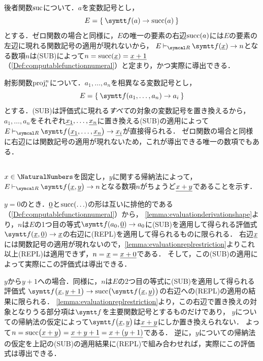 後者関数\(\operatorname{suc}\)について．\(a\)を変数記号とし，
\[
	E = \Set{\apply{\obj{f}}{a} \evaluate \apply{\succfunc}{a}}
\]
とする．ゼロ関数の場合と同様に，\(E\)の唯一の要素の右辺\(\apply{\succfunc}{a}\)には\(E\)の要素の左辺に現れる関数記号の適用が現れないから，
\(E \evaluatable \apply{\obj{f}}{\numeral{x}} \evaluate n\)となる数項\(n\)は(SUB)によって\(n = \apply{\succfunc}{\numeral{x}} = \numeral{x + 1}\)（\cref{Def:computablefunctionnumeral}）と定まり，かつ実際に導出できる．

射影関数\(\operatorname{proj}_i^n\)について．\(a_1, \dots, a_n\)を相異なる変数記号とし，
\[
	E = \Set{\apply{\obj{f}}{a_1, \dots, a_n} \evaluate a_i}
\]
とする．(SUB)は評価式に現れる\emph{すべて}の対象の変数記号を置き換えるから，
\(a_1, \dots, a_n\)をそれぞれ\(\underline{x_1}, \dots, \underline{x_n}\)に置き換える(SUB)の適用によって
\(E \evaluatable \apply{\obj{f}}{\numeral{x_1}, \dots, \numeral{x_n}} \evaluate \numeral{x_i}\)が直接得られる．
ゼロ関数の場合と同様に右辺には関数記号の適用が現れないため，これが導出できる唯一の数項でもある．

\subsection*{}

\(x \in \NaturalNumbers\)を固定し，\(y\)に関する帰納法によって，
\(E \evaluatable \apply{\obj{f}}{\numeral{x}, \numeral{y}} \evaluate n\)となる数項\(n\)がちょうど\(\underline{x + y}\)であることを示す．

\(y = 0\)のとき．\(\underline{0}\)と\(\apply{\succfunc}{\dots}\)の形は互いに排他的である（\cref{Def:computablefunctionnumeral}）から，
\cref{lemma:evaluationderivationshape}より，\(n\)は\(E\)の1つ目の等式\(\apply{\obj{f}}{a_0, \numeral{0}} \evaluate a_0\)に(SUB)を適用して得られる評価式
\(\apply{\obj{f}}{\numeral{x}, \numeral{0}} \evaluate \numeral{x}\)の右辺に(REPL)を適用して得られるものに限られる．
右辺\(\underline{x}\)には関数記号の適用が現れないので，\cref{lemma:evaluationreplrestriction}よりこれ以上(REPL)は適用できず，\(n = \underline{x} = \underline{x + 0}\)である．
そして，この(SUB)の適用によって実際にこの評価式は導出できる．

\(y\)から\(y + 1\)への場合．同様に，\(n\)は\(E\)の2つ目の等式に(SUB)を適用して得られる評価式
\(\apply{\obj{f}}{\numeral{x}, \numeral{y+1}} \evaluate \apply{\succfunc}{\apply{\obj{f}}{\numeral{x}, \numeral{y}}}\)の右辺への(REPL)の適用の結果に限られる．
\cref{lemma:evaluationreplrestriction}より，この右辺で置き換えの対象となりうる部分項は\(\obj{f}\)を主要関数記号とするものだけであり，
\(y\)についての帰納法の仮定によって\(\apply{\obj{f}}{\numeral{x}, \numeral{y}}\)は\(\underline{x + y}\)にしか置き換えられない．
よって\(n = \apply{\succfunc}{\numeral{x + y}} = \numeral{x + y + 1} = \numeral{x + (y+1)}\)である．
逆に，\(y\)についての帰納法の仮定を上記の(SUB)の適用結果に(REPL)で組み合わせれば，実際にこの評価式は導出できる．

